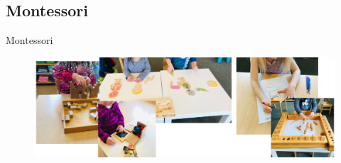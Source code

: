 \subsection{Montessori}

{
\begin{frame}{Montessori}

    \begin{figure}
        \centering
        \includegraphics[width=1.0\textwidth]{./figures/montessori/versions/drawing-v00.png}
      \end{figure}
\end{frame}
}
